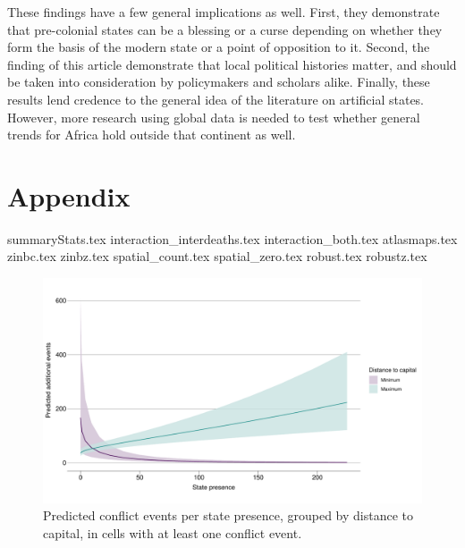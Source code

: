 These findings have a few general implications as well. First, they demonstrate
that pre-colonial states can be a blessing or a curse depending on whether they
form the basis of the modern state or a point of opposition to it. Second, the
finding of this article demonstrate that local political histories matter, and
should be taken into consideration by policymakers and scholars alike. Finally,
these results lend credence to the general idea of the literature on artificial
states. However, more research using global data is needed to test whether
general trends for Africa hold outside that continent as well.

\clearpage




\clearpage

\section{Appendix}

{summaryStats.tex}
{interaction_interdeaths.tex}
{interaction_both.tex}
{atlasmaps.tex}
{zinbc.tex}
{zinbz.tex}
{spatial_count.tex}
{spatial_zero.tex}
{robust.tex}
{robustz.tex}


\begin{figure}[htpb]
	\centering
	\includegraphics[width=\linewidth]{"../R/Output/bothzinbplot.pdf"}
	\caption{Predicted conflict events per state presence, grouped by
	distance to capital, in cells with at least one conflict event.}
	\label{bothzinb_int}
\end{figure}

